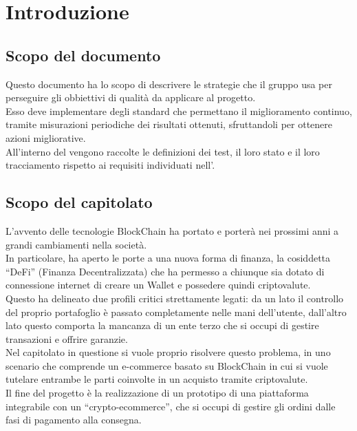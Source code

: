 \section{Introduzione}\label{section:introduzione}

\subsection{Scopo del documento}\label{subsection:scopo_documento}
Questo documento ha lo scopo di descrivere le strategie che il gruppo usa per perseguire gli obbiettivi di qualità da applicare al progetto.\\
Esso deve implementare degli standard che permettano il miglioramento continuo, tramite misurazioni periodiche dei risultati ottenuti, sfruttandoli per ottenere azioni migliorative.\\
All'interno del \docNamePdP{} vengono raccolte le definizioni dei test, il loro stato e il loro tracciamento rispetto ai requisiti individuati nell'\docNameVersionAdR{}.

\subsection{Scopo del capitolato}\label{subsection:scopo_capitolato}
L'avvento delle tecnologie BlockChain\glo{} ha portato e porterà nei prossimi anni a grandi cambiamenti nella società.\\
In particolare, ha aperto le porte a una nuova forma di finanza, la cosiddetta “DeFi” (Finanza Decentralizzata) che ha permesso a chiunque sia dotato di connessione internet di creare un Wallet\glo{} e possedere quindi criptovalute\glo{}.\\
Questo ha delineato due profili critici strettamente legati: da un lato il controllo del proprio portafoglio è passato completamente nelle mani dell'utente, dall'altro lato questo comporta la mancanza di un ente terzo che si occupi di gestire transazioni e offrire garanzie.\\
Nel capitolato in questione si vuole proprio risolvere questo problema, in uno scenario che comprende un e-commerce\glo{} basato su BlockChain\glo{} in cui si vuole tutelare entrambe le parti coinvolte in un acquisto tramite criptovalute.\\
Il fine del progetto è la realizzazione di un prototipo di una piattaforma integrabile con un “crypto-ecommerce”\glo{}, che si occupi di gestire gli ordini dalle fasi di pagamento alla consegna.

